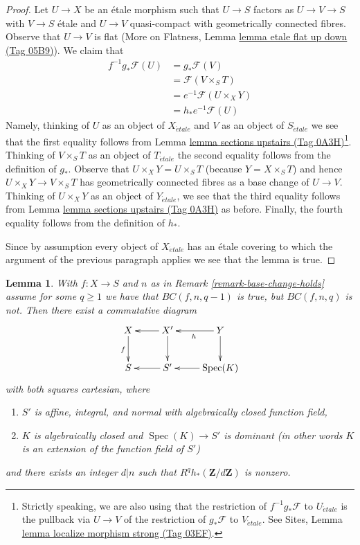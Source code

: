 \documentclass{amsart}
\theoremstyle{plain}
\newtheorem{lemma}[subsection]{Lemma}
\theoremstyle{definition}
\theoremstyle{remark}
\numberwithin{equation}{subsection}
\def\Spec{\mathop{\mathrm{Spec}}}
\def\etale{{\acute{e}tale}}
\begin{document}
\begin{proof}
Let $U \to X$ be an \'etale morphism such that $U \to S$ factors as
$U \to V \to S$ with $V \to S$ \'etale and $U \to V$ quasi-compact
with geometrically connected fibres. Observe that $U \to V$ is flat
(More on Flatness, Lemma \href{https://stacks.math.columbia.edu/tag/05B9}{lemma etale flat up down (Tag 05B9)}).
We claim that
\begin{align*}
f^{-1}g_*\mathcal{F}(U)
& = g_*\mathcal{F}(V) \\
& = \mathcal{F}(V \times_S T) \\
& = e^{-1}\mathcal{F}(U \times_X Y) \\
& = h_*e^{-1}\mathcal{F}(U)
\end{align*}
Namely, thinking of $U$ as an object of $X_\etale$ and
$V$ as an object of $S_\etale$ we see that the first equality
follows from Lemma \href{https://stacks.math.columbia.edu/tag/0A3H}{lemma sections upstairs (Tag 0A3H)}\footnote{Strictly
speaking, we are also using that the restriction of $f^{-1}g_*\mathcal{F}$
to $U_\etale$ is the pullback via $U \to V$ of the restriction of
$g_*\mathcal{F}$ to $V_\etale$. See
Sites, Lemma \href{https://stacks.math.columbia.edu/tag/03EF}{lemma localize morphism strong (Tag 03EF)}.}.
Thinking of $V \times_S T$ as an object of $T_\etale$
the second equality follows from the definition of $g_*$.
Observe that $U \times_X Y = U \times_S T$ (because $Y = X \times_S T$)
and hence $U \times_X Y \to V \times_S T$
has geometrically connected fibres as a base change of $U \to V$.
Thinking of $U \times_X Y$ as an object of $Y_\etale$, we see that
the third equality  follows from Lemma \href{https://stacks.math.columbia.edu/tag/0A3H}{lemma sections upstairs (Tag 0A3H)}
as before. Finally, the fourth equality follows from the definition
of $h_*$.

\medskip\noindent
Since by assumption every object of $X_\etale$ has an \'etale
covering to which the argument of the previous paragraph applies
we see that the lemma is true.
\end{proof}


\begin{lemma}
\label{lemma-base-change-does-not-hold}
With $f : X \to S$ and $n$ as in Remark \ref{remark-base-change-holds}
assume for some $q \geq 1$ we have that
$BC(f, n, q - 1)$ is true, but $BC(f, n, q)$ is not.
Then there exist a commutative diagram
$$
\xymatrix{
X \ar[d]_f & X' \ar[d] \ar[l] & Y \ar[l]^h \ar[d] \\
S & S' \ar[l] & \Spec(K) \ar[l]
}
$$
with both squares cartesian, where
\begin{enumerate}
\item $S'$ is affine, integral, and normal with algebraically
closed function field,
\item $K$ is algebraically closed and $\Spec(K) \to S'$
is dominant (in other words $K$ is an extension of
the function field of $S'$)
\end{enumerate}
and there exists an integer $d | n$
such that $R^qh_*(\mathbf{Z}/d\mathbf{Z})$ is nonzero.
\end{lemma}
\end{document}
